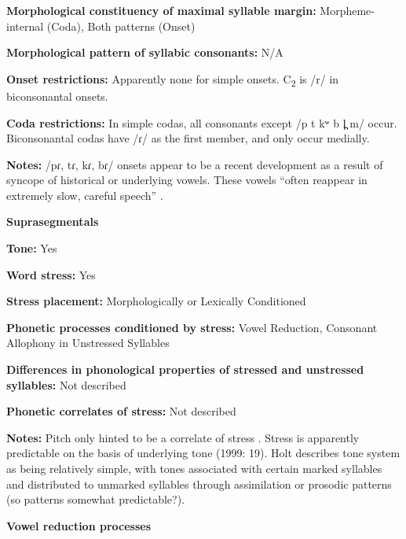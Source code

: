 \textbf{Morphological constituency of maximal syllable margin:} Morpheme-internal (Coda), Both patterns (Onset)



\textbf{Morphological pattern of syllabic consonants:} N/A



\textbf{Onset restrictions:} Apparently none for simple onsets. C\textsubscript{2} is /r/ in biconsonantal onsets.



\textbf{Coda restrictions:} In simple codas, all consonants except /p t kʷ b l̪ m/ occur. Biconsonantal codas have /ɾ/ as the first member, and only occur medially.



\textbf{Notes:} /pɾ, tɾ, kɾ, bɾ/ onsets appear to be a recent development as a result of syncope of historical or underlying vowels. These vowels “often reappear in extremely slow, careful speech” \citep[20]{Holt1999}.



\textbf{Suprasegmentals}



\textbf{Tone:} Yes



\textbf{Word stress:} Yes



\textbf{Stress placement:} Morphologically or Lexically Conditioned



\textbf{Phonetic processes conditioned by stress:} Vowel Reduction, Consonant Allophony in Unstressed Syllables



\textbf{Differences in phonological properties of stressed and unstressed syllables:} Not described



\textbf{Phonetic correlates of stress:} Not described



\textbf{Notes:} Pitch only hinted to be a correlate of stress \citep[238]{Holt1986}. Stress is apparently predictable on the basis of underlying tone (1999: 19). Holt describes tone system as being relatively simple, with tones associated with certain marked syllables and distributed to unmarked syllables through assimilation or prosodic patterns (so patterns somewhat predictable?).



\textbf{Vowel reduction processes}



